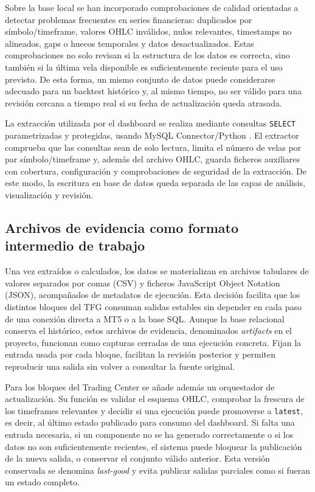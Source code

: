 Sobre la base local se han incorporado comprobaciones de calidad orientadas a
detectar problemas frecuentes en series financieras: duplicados por
s\'imbolo/timeframe, valores OHLC inv\'alidos, nulos relevantes, timestamps no
alineados, gaps o huecos temporales y datos desactualizados. Estas comprobaciones no solo revisan si
la estructura de los datos es correcta, sino tambi\'en si la \'ultima vela
disponible es suficientemente reciente para el uso previsto. De esta forma, un
mismo conjunto de datos puede considerarse adecuado para un backtest hist\'orico
y, al mismo tiempo, no ser v\'alido para una revisi\'on cercana a tiempo real si
su fecha de actualizaci\'on queda atrasada.

La extracci\'on utilizada por el dashboard se realiza mediante consultas
\texttt{SELECT} parametrizadas y protegidas, usando MySQL Connector/Python
\cite{mysql_connector_python_docs}. El extractor comprueba que las consultas
sean de solo lectura, limita el n\'umero de velas por par s\'imbolo/timeframe y,
adem\'as del archivo OHLC, guarda ficheros auxiliares con cobertura,
configuraci\'on y comprobaciones de seguridad de la extracci\'on. De este modo,
la escritura en base de datos queda separada de las capas de an\'alisis,
visualizaci\'on y revisi\'on.

\subsection{Archivos de evidencia como formato intermedio de trabajo}
\label{subsec:artifacts-datos}

Una vez extra\'idos o calculados, los datos se materializan en archivos
tabulares de valores separados por comas (CSV) y ficheros JavaScript Object
Notation (JSON), acompa\~nados de metadatos de ejecuci\'on. Esta decisi\'on facilita que
los distintos bloques del TFG consuman salidas estables sin depender en cada
paso de una conexi\'on directa a MT5 o a la base SQL. Aunque la base
relacional conserva el hist\'orico, estos archivos de evidencia, denominados
\textit{artifacts} en el proyecto, funcionan como capturas cerradas de una
ejecuci\'on concreta. Fijan la entrada usada por cada bloque, facilitan la
revisi\'on posterior y permiten reproducir una salida sin volver a consultar la
fuente original.

Para los bloques del Trading Center se a\~nade adem\'as un orquestador de
actualizaci\'on. Su funci\'on es validar el esquema OHLC, comprobar la frescura de los
timeframes relevantes y decidir si una ejecuci\'on puede promoverse a
\texttt{latest}, es decir, al \'ultimo estado publicado para consumo del
dashboard. Si falta una entrada necesaria, si un componente no se ha generado
correctamente o si los datos no son suficientemente recientes, el sistema puede
bloquear la publicaci\'on de la nueva salida,
o conservar el conjunto v\'alido anterior. Esta versi\'on conservada se
denomina \textit{last-good} y evita publicar salidas parciales como si fueran un
estado completo.

